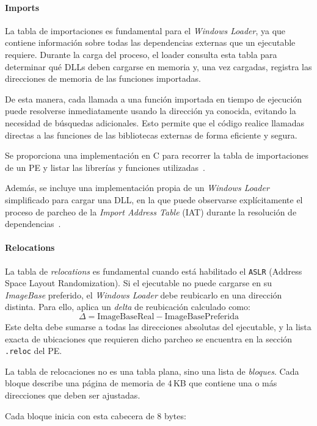 \paragraph{Imports}

La tabla de importaciones es fundamental para el \textit{Windows Loader}, ya que contiene información sobre todas las dependencias externas que un ejecutable requiere. Durante la carga del proceso, el loader consulta esta tabla para determinar qué DLLs deben cargarse en memoria y, una vez cargadas, registra las direcciones de memoria de las funciones importadas.

De esta manera, cada llamada a una función importada en tiempo de ejecución puede resolverse inmediatamente usando la dirección ya conocida, evitando la necesidad de búsquedas adicionales. Esto permite que el código realice llamadas directas a las funciones de las bibliotecas externas de forma eficiente y segura.

Se proporciona una implementación en C para recorrer la tabla de importaciones de un PE y listar las librerías y funciones utilizadas~\cite{walking_PE_imports}.  

Además, se incluye una implementación propia de un \textit{Windows Loader} simplificado para cargar una DLL, en la que puede observarse explícitamente el proceso de parcheo de la \textit{Import Address Table} (IAT) durante la resolución de dependencias~\cite{walkingloader}.

\paragraph{Relocations}

La tabla de \textit{relocations} es fundamental cuando está habilitado el \texttt{ASLR} (Address Space Layout Randomization).  
Si el ejecutable no puede cargarse en su \textit{ImageBase} preferido, el \textit{Windows Loader} debe reubicarlo en una dirección distinta. Para ello, aplica un \textit{delta} de reubicación calculado como:
\[
\Delta = \text{ImageBaseReal} - \text{ImageBasePreferida}
\]
Este delta debe sumarse a todas las direcciones absolutas del ejecutable, y la lista exacta de ubicaciones que requieren dicho parcheo se encuentra en la sección \texttt{.reloc} del PE.

La tabla de relocaciones no es una tabla plana, sino una lista de \textit{bloques}.  
Cada bloque describe una página de memoria de 4\,KB que contiene una o más direcciones que deben ser ajustadas. 

Cada bloque inicia con esta cabecera de 8 bytes:

